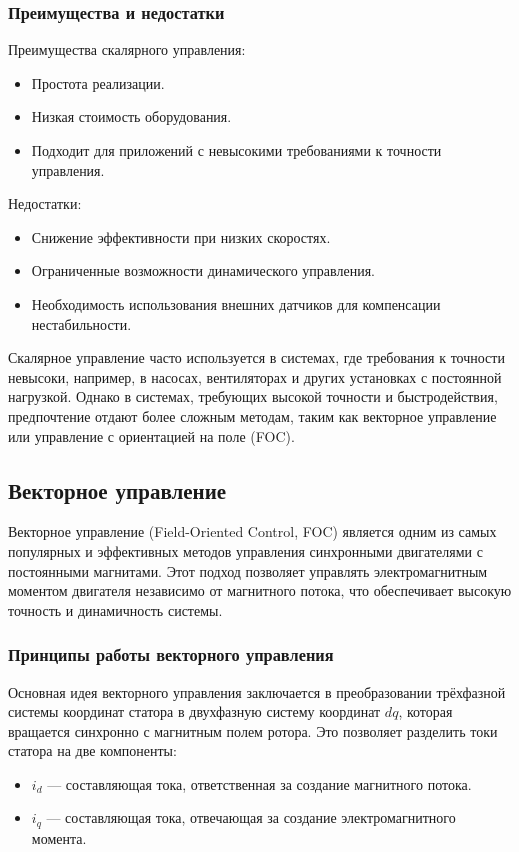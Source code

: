 \documentclass[a4paper,14pt]{extarticle} %
\begin{document}
\subsubsection*{Преимущества и недостатки}

Преимущества скалярного управления:
\begin{itemize}
\item Простота реализации.
\item Низкая стоимость оборудования.
\item Подходит для приложений с невысокими требованиями к точности управления.
\end{itemize}

Недостатки:
\begin{itemize}
\item Снижение эффективности при низких скоростях.
\item Ограниченные возможности динамического управления.
\item Необходимость использования внешних датчиков для компенсации нестабильности.
\end{itemize}

Скалярное управление часто используется в системах, где требования к точности невысоки, например, в насосах, вентиляторах и других установках с постоянной нагрузкой. Однако в системах, требующих высокой точности и быстродействия, предпочтение отдают более сложным методам, таким как векторное управление или управление с ориентацией на поле (FOC).


\subsection*{Векторное управление}

Векторное управление (Field-Oriented Control, FOC) является одним из самых популярных и эффективных методов управления синхронными двигателями с постоянными магнитами. Этот подход позволяет управлять электромагнитным моментом двигателя независимо от магнитного потока, что обеспечивает высокую точность и динамичность системы.

\subsubsection*{Принципы работы векторного управления}

Основная идея векторного управления заключается в преобразовании трёхфазной системы координат статора в двухфазную систему координат $dq$, которая вращается синхронно с магнитным полем ротора. Это позволяет разделить токи статора на две компоненты:
\begin{itemize}
\item $i_d$ — составляющая тока, ответственная за создание магнитного потока.
\item $i_q$ — составляющая тока, отвечающая за создание электромагнитного момента.
\end{itemize}
\end{document}
